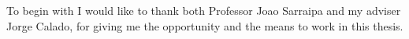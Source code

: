 \acknowledgements

 To begin with I would like to thank both Professor Joao Sarraipa and my adviser Jorge Calado, for giving me the opportunity and the means to work in this thesis.




